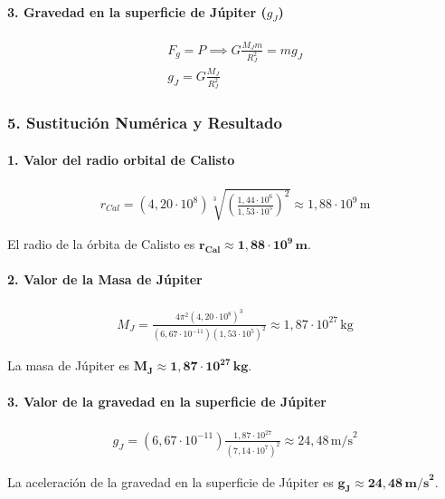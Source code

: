 \paragraph*{3. Gravedad en la superficie de Júpiter ($g_J$)}
\begin{gather}
    F_g = P \implies G \frac{M_J m}{R_J^2} = m g_J \nonumber \\[8pt]
    g_J = G \frac{M_J}{R_J^2}
\end{gather}

\subsubsection*{5. Sustitución Numérica y Resultado}
\paragraph*{1. Valor del radio orbital de Calisto}
\begin{gather}
    r_{Cal} = (4,20 \cdot 10^8) \sqrt[3]{\left(\frac{1,44 \cdot 10^6}{1,53 \cdot 10^5}\right)^2} \approx 1,88 \cdot 10^9 \, \text{m}
\end{gather}
\begin{cajaresultado}
    El radio de la órbita de Calisto es $\boldsymbol{r_{Cal} \approx 1,88 \cdot 10^9 \, \textbf{m}}$.
\end{cajaresultado}

\paragraph*{2. Valor de la Masa de Júpiter}
\begin{gather}
    M_J = \frac{4\pi^2 (4,20 \cdot 10^8)^3}{(6,67 \cdot 10^{-11})(1,53 \cdot 10^5)^2} \approx 1,87 \cdot 10^{27} \, \text{kg}
\end{gather}
\begin{cajaresultado}
    La masa de Júpiter es $\boldsymbol{M_J \approx 1,87 \cdot 10^{27} \, \textbf{kg}}$.
\end{cajaresultado}

\paragraph*{3. Valor de la gravedad en la superficie de Júpiter}
\begin{gather}
    g_J = (6,67 \cdot 10^{-11}) \frac{1,87 \cdot 10^{27}}{(7,14 \cdot 10^7)^2} \approx 24,48 \, \text{m/s}^2
\end{gather}
\begin{cajaresultado}
    La aceleración de la gravedad en la superficie de Júpiter es $\boldsymbol{g_J \approx 24,48 \, \textbf{m/s}^2}$.
\end{cajaresultado}


